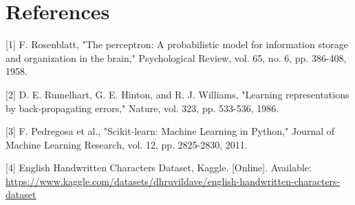 \documentclass[11pt]{article}
\begin{document}
\section{References}
\label{sec:org0300385}

[1] F. Rosenblatt, "The perceptron: A probabilistic model for information storage and
organization in the brain," Psychological Review, vol. 65, no. 6, pp. 386-408, 1958.

[2] D. E. Rumelhart, G. E. Hinton, and R. J. Williams, "Learning representations by
back-propagating errors," Nature, vol. 323, pp. 533-536, 1986.

[3] F. Pedregosa et al., "Scikit-learn: Machine Learning in Python," Journal of Machine
Learning Research, vol. 12, pp. 2825-2830, 2011.

[4] English Handwritten Characters Dataset, Kaggle. [Online]. Available:
\url{https://www.kaggle.com/datasets/dhruvildave/english-handwritten-characters-dataset}
\end{document}
